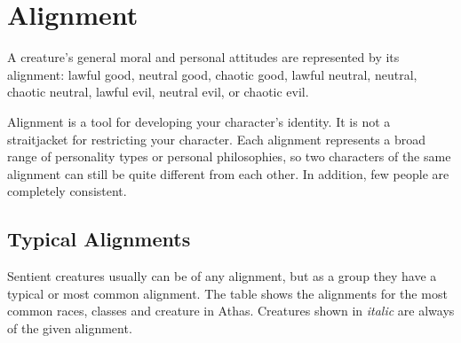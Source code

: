 \section{Alignment}
A creature's general moral and personal attitudes are represented by its alignment: lawful good, neutral good, chaotic good, lawful neutral, neutral, chaotic neutral, lawful evil, neutral evil, or chaotic evil.

Alignment is a tool for developing your character's identity. It is not a straitjacket for restricting your character. Each alignment represents a broad range of personality types or personal philosophies, so two characters of the same alignment can still be quite different from each other. In addition, few people are completely consistent.

\subsection{Typical Alignments}
Sentient creatures usually can be of any alignment, but as a group they have a typical or most common alignment. The table  shows the alignments for the most common races, classes and creature in Athas. Creatures shown in \emph{italic} are always of the given alignment.


